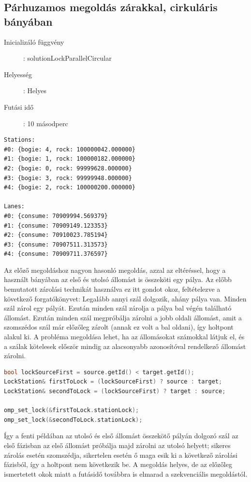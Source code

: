 \documentclass[a4paper,10pt]{article}
\begin{document}
    \subsection{Párhuzamos megoldás zárakkal, cirkuláris bányában}
\begin{description}
  \item[Inicializáló függvény]: solutionLockParallelCircular
  \item[Helyesség]: Helyes
  \item[Futási idő]: 10 másodperc
\end{description}

\begin{lstlisting}
Stations:
#0: {bogie: 4, rock: 100000042.000000}
#1: {bogie: 1, rock: 100000182.000000}
#2: {bogie: 0, rock: 99999628.000000}
#3: {bogie: 3, rock: 99999948.000000}
#4: {bogie: 2, rock: 100000200.000000}

Lanes:
#0: {consume: 70909994.569379}
#1: {consume: 70909149.123353}
#2: {consume: 70910023.785194}
#3: {consume: 70907511.313573}
#4: {consume: 70909711.376597}
\end{lstlisting}

Az előző megoldáshoz nagyon hasonló megoldás, azzal az eltéréssel, hogy a használt bányában az első és utolsó állomást is összeköti egy pálya. Az előbb bemutatott zárolási technikát használva ez itt gondot okoz, feltételezve a következő forgatókönyvet: Legalább annyi szál dolgozik, ahány pálya van. Minden szál zárol egy pályát. Ezután minden szál zárolja a pálya bal végén található állomást. Ezután minden szál megpróbálja zárolni a jobb oldali állomást, amit a szomszédos szál már előzőleg zárolt (annak ez volt a bal oldani), így holtpont alakul ki. A probléma megoldása lehet, ha az állomásokat számokkal látjuk el, és a szálak kötelesek először mindig az alacsonyabb azonosítóval rendelkező állomást zárolni.

\begin{lstlisting}[language=c]
bool lockSourceFirst = source.getId() < target.getId();
LockStation& firstToLock = (lockSourceFirst) ? source : target;
LockStation& secondToLock = (lockSourceFirst) ? target : source;

omp_set_lock(&firstToLock.stationLock);
omp_set_lock(&secondToLock.stationLock);
\end{lstlisting}

Így a fenti példában az utolsó és első állomást összekötő pályán dolgozó szál az első fázisban az első állomást próbálja majd zárolni az utolsó helyett; sikeres zárolás esetén szomszédja, sikertelen esetén ő maga esik ki a következő zárolási fázisból, így a holtpont nem következik be.
A megoldás helyes, de az előzőleg ismertetett okok miatt a futásidő továbbra is elmarad a szekvenciális megoldástól.
\end{document}
